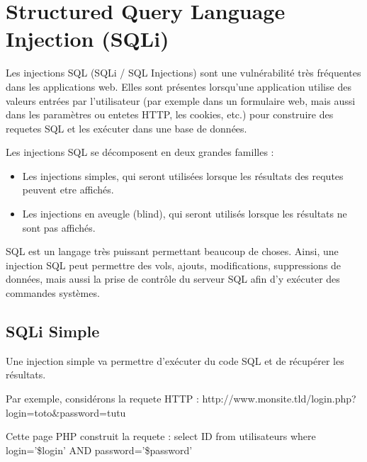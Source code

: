 

\newpage
\section{Structured Query Language Injection (SQLi)}\label{vulnerabilites:web:sqli}

Les injections SQL (SQLi / SQL Injections) sont une vulnérabilité très fréquentes dans les applications web. Elles sont présentes lorsqu'une application utilise des valeurs entrées par l'utilisateur (par exemple dans un formulaire web, mais aussi dans les paramètres ou entetes HTTP, les cookies, etc.) pour construire des requetes SQL et les exécuter dans une base de données.

Les injections SQL se décomposent en deux grandes familles :
\begin{tabbing}
\end{tabbing}
\begin{itemize}
\item Les injections simples, qui seront utilisées lorsque les résultats des requtes peuvent etre affichés.
\item Les injections en aveugle (blind), qui seront utilisés lorsque les résultats ne sont pas affichés.
\end{itemize}


SQL est un langage très puissant permettant beaucoup de choses. Ainsi, une injection SQL peut permettre des vols, ajouts, modifications, suppressions de données, mais aussi la prise de contrôle du serveur SQL afin d'y exécuter des commandes systèmes.


\subsection{SQLi Simple}\label{vulnerabilites:web:sqli:simple}

Une injection simple va permettre d'exécuter du code SQL et de récupérer les résultats.

Par exemple, considérons la requete HTTP :
http://www.monsite.tld/login.php?login=toto\&password=tutu

Cette page PHP construit la requete :
select ID from utilisateurs where login='\$login' AND password='\$password'

